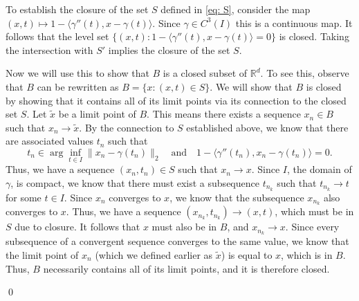 \documentclass[11pt]{article}
\begin{document}
To establish the closure of the set $S$ defined in \cref{eq: S}, consider the map $(x,t) \mapsto 1 - \langle \gamma''(t), x - \gamma(t)\rangle$. Since $\gamma \in C^3(I)$ this is a continuous map. It follows that the level set $\{(x,t) : 1 - \langle \gamma''(t), x - \gamma(t)\rangle = 0\}$ is closed. Taking the intersection with $S'$ implies the closure of the set $S$. 

Now we will use this to show that $B$ is a closed subset of $\mathbb{R}^d$. To see this, observe that $B$ can be rewritten as $B = \{x : (x,t) \in S\}.$ We will show that $B$ is closed by showing that it contains all of its limit points via its connection to the closed set $S$. Let $\tilde{x}$ be a limit point of $B$. This means there exists a sequence $x_n \in B$ such that $x_n\rightarrow \tilde{x}$. By the connection to $S$ established above, we know that there are associated values $t_n$ such that 
\[t_n \in \arg\inf_{t \in I}\|x_n - \gamma(t_n)\|_2 \quad \text{and} \quad 1 - \langle\gamma''(t_n), x_n - \gamma(t_n)\rangle = 0.\]
Thus, we have a sequence $(x_n, t_n) \in S$ such that $x_n \rightarrow x$. Since $I$, the domain of $\gamma$, is compact, we know that there must exist a subsequence $t_{n_k}$ such that $t_{n_k}\rightarrow t$ for some $t \in I$. Since $x_n$ converges to $x$, we know that the subsequence $x_{n_k}$ also converges to $x$. Thus, we have a sequence $(x_{n_k}, t_{n_k}) \rightarrow (x,t)$, which must be in $S$ due to closure. It follows that $x$ must also be in $B$, and $x_{n_k} \rightarrow x$. Since every subsequence of a convergent sequence converges to the same value, we know that the limit point of $x_{n}$ (which we defined earlier as $\tilde{x}$) is equal to $x$, which is in $B$. Thus, $B$ necessarily contains all of its limit points, and it is therefore closed.  

\qed{}
\end{document}
